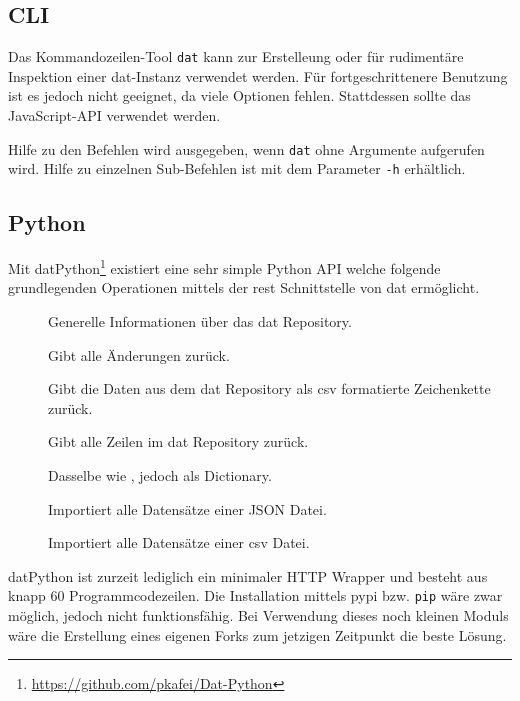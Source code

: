 \subsection{CLI}

Das Kommandozeilen-Tool \texttt{dat} kann zur Erstelleung oder für rudimentäre Inspektion einer dat-Instanz verwendet werden. Für fortgeschrittenere Benutzung ist es jedoch nicht geeignet, da viele Optionen fehlen. Stattdessen sollte das JavaScript-API verwendet werden.

Hilfe zu den Befehlen wird ausgegeben, wenn \texttt{dat} ohne Argumente aufgerufen wird. Hilfe zu einzelnen Sub-Befehlen ist mit dem Parameter \texttt{-h} erhältlich.

\subsection{Python}

Mit datPython\footnote{\url{https://github.com/pkafei/Dat-Python}} existiert eine sehr simple Python API welche folgende grundlegenden Operationen mittels der \gls{rest} Schnittstelle von \gls{dat} ermöglicht.

\begin{description}
	\item[] Generelle Informationen über das \gls{dat} Repository.
	\item[] Gibt alle Änderungen zurück.
	\item[] Gibt die Daten aus dem dat Repository als \gls{csv} formatierte Zeichenkette zurück.
	\item[] Gibt alle Zeilen im dat Repository zurück.
	\item[] Dasselbe wie , jedoch als Dictionary.
	\item[] Importiert alle Datensätze einer JSON Datei.
	\item[] Importiert alle Datensätze einer \gls{csv} Datei.
\end{description}

datPython ist zurzeit lediglich ein minimaler HTTP Wrapper und besteht aus knapp 60 Programmcodezeilen. Die Installation mittels \gls{pypi} bzw. \texttt{pip} wäre zwar möglich, jedoch nicht funktionsfähig. Bei Verwendung dieses noch kleinen Moduls wäre die Erstellung eines eigenen Forks zum jetzigen Zeitpunkt die beste Lösung.

